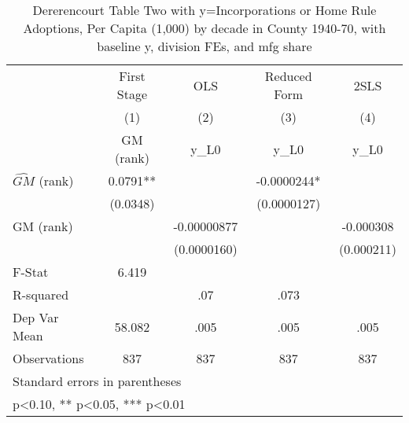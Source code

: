 \begin{table}[htbp]\centering
\def\sym#1{\ifmmode^{#1}\else\(^{#1}\)\fi}
\caption{Dererencourt Table Two with y=Incorporations or Home Rule Adoptions, Per Capita (1,000) by decade in County 1940-70, with baseline y, division FEs, and mfg share}
\begin{tabular}{l*{4}{c}}
\toprule
                    & First Stage   &         OLS   &Reduced Form   &        2SLS   \\
                    &\multicolumn{1}{c}{(1)}&\multicolumn{1}{c}{(2)}&\multicolumn{1}{c}{(3)}&\multicolumn{1}{c}{(4)}\\
                    &\multicolumn{1}{c}{GM  (rank)}&\multicolumn{1}{c}{y\_L0}&\multicolumn{1}{c}{y\_L0}&\multicolumn{1}{c}{y\_L0}\\
\midrule
$\hat{GM}$ (rank)   &      0.0791** &               &  -0.0000244*  &               \\
                    &    (0.0348)   &               & (0.0000127)   &               \\
\addlinespace
GM  (rank)          &               & -0.00000877   &               &   -0.000308   \\
                    &               & (0.0000160)   &               &  (0.000211)   \\
\midrule
F-Stat              &       6.419   &               &               &               \\
R-squared           &               &         .07   &        .073   &               \\
Dep Var Mean        &      58.082   &        .005   &        .005   &        .005   \\
Observations        &         837   &         837   &         837   &         837   \\
\bottomrule
\multicolumn{5}{l}{\footnotesize Standard errors in parentheses}\\
\multicolumn{5}{l}{\footnotesize * p<0.10, ** p<0.05, *** p<0.01}\\
\end{tabular}
\end{table}

